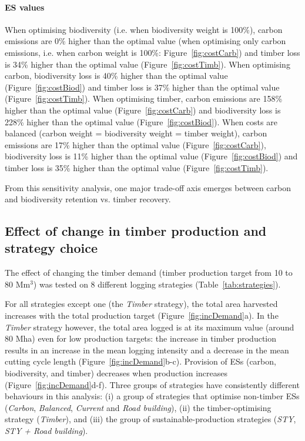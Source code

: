 \documentclass{article}
\begin{document}
\paragraph{ES values}

When optimising biodiversity (i.e. when biodiversity weight is 100\%), carbon emissions are 0\% higher than the optimal value (when optimising only carbon emissions, i.e. when carbon weight is 100\%: Figure~\ref{fig:costCarb}) and timber loss is 34\% higher than the optimal value (Figure~\ref{fig:costTimb}). When optimising carbon, biodiversity loss is 40\% higher than the optimal value (Figure~\ref{fig:costBiod}) and timber loss is 37\% higher than the optimal value (Figure~\ref{fig:costTimb}). When optimising timber, carbon emissions are 158\% higher than the optimal value (Figure~\ref{fig:costCarb}) and biodiversity loss is 228\% higher than the optimal value (Figure~\ref{fig:costBiod}).  When costs are balanced (carbon weight = biodiversity weight = timber weight), carbon emissions are 17\% higher than the optimal value (Figure~\ref{fig:costCarb}), biodiversity loss is 11\% higher than the optimal value (Figure~\ref{fig:costBiod}) and timber loss is 35\% higher than the optimal value (Figure~\ref{fig:costTimb}). 

From this sensitivity analysis, one major trade-off axis emerges between carbon and biodiversity retention vs. timber recovery. 



\subsection{Effect of change in timber production and strategy choice}

The effect of changing the timber demand (timber production target from 10 to 80 Mm$^3$) was tested on 8 different logging strategies (Table~\ref{tab:strategies}).

For all strategies except one (the \textit{Timber} strategy), the total area harvested increases with the total production target (Figure~\ref{fig:incDemand}a). 
In the \textit{Timber} strategy however, the total area logged is at its maximum value (around 80 Mha) even for low production targets: the increase in timber production results in an increase in the mean logging intensity and a decrease in the mean cutting cycle length (Figure~\ref{fig:incDemand}b-c). 
Provision of ESs (carbon, biodiversity, and timber) decreases when production increases (Figure~\ref{fig:incDemand}d-f).
Three groups of strategies have consistently different behaviours in this analysis: (i) a group of strategies that optimise non-timber ESs (\textit{Carbon}, \textit{Balanced}, \textit{Current} and \textit{Road building}), (ii) the timber-optimising strategy (\textit{Timber}), and (iii) the group of sustainable-production strategies (\textit{STY}, \textit{STY + Road building}). 
\end{document}
